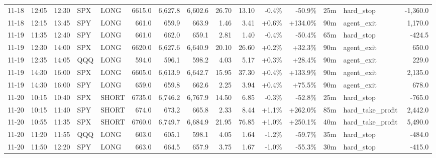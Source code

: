 \documentclass[11pt,a4paper,twoside]{article}
\begin{document}
\begin{landscape}
\begin{center}
\begin{longtable}{>{\color{txtmain}}l l l l l r r r r r r r r >{\color{txtmain}}l r}
11-18 & 12:05 & 12:30 & SPX & LONG & 6615.0 & 6,627.8 & 6,602.6 & 26.70 & 13.10 & \textcolor{lossred}{-0.4\%} & \textcolor{lossred}{-50.9\%} & 25m & hard\_stop & \textcolor{lossred}{-1,360.0} \\
11-18 & 12:15 & 13:45 & SPY & LONG & 661.0 & 659.9 & 663.9 & 1.46 & 3.41 & \textcolor{wingreen}{+0.6\%} & \textcolor{wingreen}{+134.0\%} & 90m & agent\_exit & \textcolor{wingreen}{1,170.0} \\
11-19 & 11:35 & 12:40 & SPY & LONG & 661.0 & 662.0 & 659.1 & 2.81 & 1.40 & \textcolor{lossred}{-0.4\%} & \textcolor{lossred}{-50.4\%} & 65m & hard\_stop & \textcolor{lossred}{-424.5} \\
11-19 & 12:30 & 14:00 & SPX & LONG & 6620.0 & 6,627.6 & 6,640.9 & 20.10 & 26.60 & \textcolor{wingreen}{+0.2\%} & \textcolor{wingreen}{+32.3\%} & 90m & agent\_exit & \textcolor{wingreen}{650.0} \\
11-19 & 12:35 & 14:05 & QQQ & LONG & 594.0 & 596.1 & 598.2 & 4.03 & 5.17 & \textcolor{wingreen}{+0.3\%} & \textcolor{wingreen}{+28.4\%} & 90m & agent\_exit & \textcolor{wingreen}{229.0} \\
11-19 & 14:30 & 16:00 & SPX & LONG & 6605.0 & 6,613.9 & 6,642.7 & 15.95 & 37.30 & \textcolor{wingreen}{+0.4\%} & \textcolor{wingreen}{+133.9\%} & 90m & agent\_exit & \textcolor{wingreen}{2,135.0} \\
11-19 & 14:30 & 16:00 & SPY & LONG & 659.0 & 659.8 & 662.6 & 2.25 & 3.94 & \textcolor{wingreen}{+0.4\%} & \textcolor{wingreen}{+75.5\%} & 90m & agent\_exit & \textcolor{wingreen}{678.0} \\
11-20 & 10:15 & 10:40 & SPX & SHORT & 6735.0 & 6,746.2 & 6,767.9 & 14.50 & 6.85 & \textcolor{lossred}{-0.3\%} & \textcolor{lossred}{-52.8\%} & 25m & hard\_stop & \textcolor{lossred}{-765.0} \\
11-20 & 10:15 & 11:40 & SPY & SHORT & 674.0 & 673.2 & 665.8 & 2.33 & 8.44 & \textcolor{wingreen}{+1.1\%} & \textcolor{wingreen}{+262.0\%} & 85m & hard\_take\_profit & \textcolor{wingreen}{2,442.0} \\
11-20 & 10:55 & 11:35 & SPX & SHORT & 6760.0 & 6,749.7 & 6,684.9 & 21.95 & 76.85 & \textcolor{wingreen}{+1.0\%} & \textcolor{wingreen}{+250.1\%} & 40m & hard\_take\_profit & \textcolor{wingreen}{5,490.0} \\
11-20 & 11:20 & 11:55 & QQQ & LONG & 603.0 & 605.1 & 598.1 & 4.05 & 1.64 & \textcolor{lossred}{-1.2\%} & \textcolor{lossred}{-59.7\%} & 35m & hard\_stop & \textcolor{lossred}{-484.0} \\
11-20 & 11:50 & 12:20 & SPY & LONG & 663.0 & 664.5 & 657.9 & 3.75 & 1.67 & \textcolor{lossred}{-1.0\%} & \textcolor{lossred}{-55.3\%} & 30m & hard\_stop & \textcolor{lossred}{-415.0} \\

\end{longtable}
\end{center}
\end{landscape}
\end{document}
